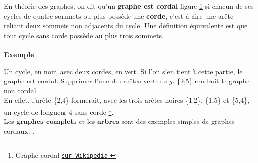 \documentclass[hidelinks,letterpaper,12pt]{article}
\newcounter{Exemple} %
\begin{document}
En théorie des graphes, on dit qu'un \textbf{graphe est cordal} figure \ref{figure Graphe cordal} si chacun de ses cycles de quatre sommets ou plus possède une \textbf{corde}, c'est-à-dire une arête reliant deux sommets non adjacents du cycle. Une définition équivalente est que tout cycle sans corde possède au plus trois sommets.
\\ \\
\textbf{Exemple}
\begin{figure}[H]
\centering
{}
\label{figure Graphe cordal}
\end{figure}
Un cycle, en noir, avec deux cordes, en vert. Si l'on s'en tient à cette partie, le graphe est cordal. Supprimer l'une des arêtes vertes \textit{e.g.} \{2,5\} rendrait le graphe non cordal.
\\
En effet, l'arête \{2,4\} formerait, avec les trois arêtes noires \{1,2\}, \{1,5\} et \{5,4\}, un cycle de longueur 4 sans corde 
\footnote{Graphe cordal \href{https://fr.wikipedia.org/wiki/Graphe_cordal}     
{\texttt{sur Wikipedia} } }.
\\
Les \textbf{graphes complets} et les \textbf{arbres} sont des exemples simples de graphes cordaux. \citep{Bondy-Murty}.
\bigbreak 
\end{document}
